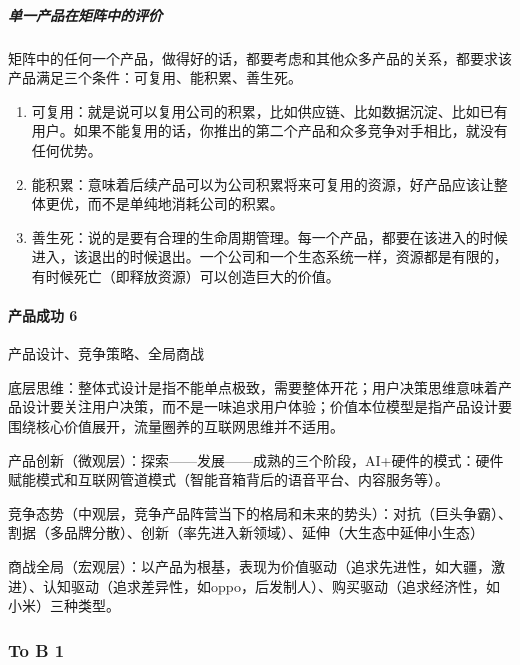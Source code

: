 \documentclass[letterpaper,11pt,english]{sphinxmanual}
\begin{document}
\subparagraph{单一产品在矩阵中的评价}
\label{\detokenize{chapter_introduction/Product:id37}}
矩阵中的任何一个产品，做得好的话，都要考虑和其他众多产品的关系，都要求该产品满足三个条件：可复用、能积累、善生死。
\begin{enumerate}
%
\item {} 
可复用：就是说可以复用公司的积累，比如供应链、比如数据沉淀、比如已有用户。如果不能复用的话，你推出的第二个产品和众多竞争对手相比，就没有任何优势。

\item {} 
能积累：意味着后续产品可以为公司积累将来可复用的资源，好产品应该让整体更优，而不是单纯地消耗公司的积累。

\item {} 
善生死：说的是要有合理的生命周期管理。每一个产品，都要在该进入的时候进入，该退出的时候退出。一个公司和一个生态系统一样，资源都是有限的，有时候死亡（即释放资源）可以创造巨大的价值。

\end{enumerate}


\paragraph{产品成功 6\sphinxfootnotemark[9]}
\label{\detokenize{chapter_introduction/Product:id38}}%
\begin{footnotetext}[9]\sphinxAtStartFootnote
{}
%
\end{footnotetext}\ignorespaces 
产品设计、竞争策略、全局商战

底层思维：整体式设计是指不能单点极致，需要整体开花；用户决策思维意味着产品设计要关注用户决策，而不是一味追求用户体验；价值本位模型是指产品设计要围绕核心价值展开，流量圈养的互联网思维并不适用。

产品创新（微观层）：探索——发展——成熟的三个阶段，AI+硬件的模式：硬件赋能模式和互联网管道模式（智能音箱背后的语音平台、内容服务等）。

竞争态势（中观层，竞争产品阵营当下的格局和未来的势头）：对抗（巨头争霸）、割据（多品牌分散）、创新（率先进入新领域）、延伸（大生态中延伸小生态）

商战全局（宏观层）：以产品为根基，表现为价值驱动（追求先进性，如大疆，激进）、认知驱动（追求差异性，如oppo，后发制人）、购买驱动（追求经济性，如小米）三种类型。


\subsubsection{To B 1\sphinxfootnotemark[10]}
\label{\detokenize{chapter_introduction/2B:to-b-1}}\label{\detokenize{chapter_introduction/2B::doc}}%
\begin{footnotetext}[10]\sphinxAtStartFootnote
{}
%
\end{footnotetext}\ignorespaces 
\end{document}
